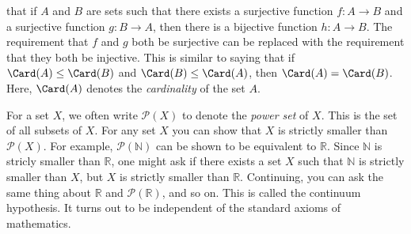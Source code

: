         that if $A$ and $B$ are sets such that there exists
        a surjective function $f:A\rightarrow{B}$ and a
        surjective function $g:B\rightarrow{A}$, then there
        is a bijective function $h:A\rightarrow{B}$. The
        requirement that $f$ and $g$ both be surjective
        can be replaced with the requirement that they both
        be injective. This is similar to saying that if
        $\Card(A)\leq\Card(B)$ and $\Card(B)\leq\Card(A)$,
        then $\Card(A)=\Card(B)$. Here, $\Card(A)$ denotes
        the \textit{cardinality} of the set $A$.
        \par\hfill\par
        \vspace{-2ex}
        For a set $X$, we often write
        $\mathcal{P}(X)$ to denote the
        \textit{power set} of $X$. This is the
        set of all subsets of $X$.
        For any set $X$ you can show that $X$ is
        strictly smaller than $\mathcal{P}(X)$.
        For example, $\mathcal{P}(\mathbb{N})$
        can be shown to be equivalent to $\mathbb{R}$.
        Since $\mathbb{N}$ is stricly smaller than
        $\mathbb{R}$, one might ask if there exists
        a set $X$ such that $\mathbb{N}$ is strictly
        smaller than $X$, but $X$ is strictly smaller
        than $\mathbb{R}$. Continuing, you can ask the
        same thing about $\mathbb{R}$ and
        $\mathcal{P}(\mathbb{R})$, and so on.
        This is called the continuum hypothesis.
        It turns out to be independent of
        the standard axioms of mathematics.
